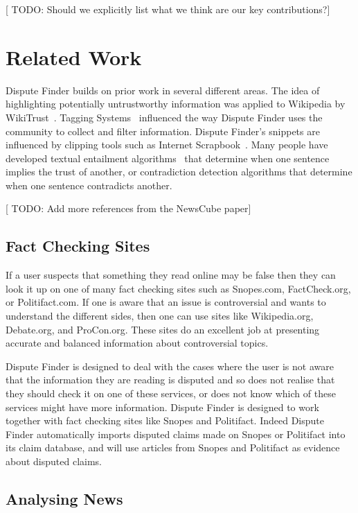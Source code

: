 \documentclass{www2010-submission}
\newcommand{\todo}[1]{{[\color{blue} TODO: #1]}}
\begin{document}
\todo{Should we explicitly list what we think are our key contributions?}


\section{Related Work}

Dispute Finder builds on prior work in several different areas. The idea of highlighting potentially untrustworthy information was applied to Wikipedia by WikiTrust~\cite{Adler2008a}. Tagging Systems~\cite{Marlow2006} influenced the way Dispute Finder uses the community to collect and filter information. Dispute Finder's snippets are influenced by clipping tools such as Internet Scrapbook~\cite{Sugiura1998}. Many people have developed textual entailment algorithms~\cite{entail?} that determine when one sentence implies the trust of another, or contradiction detection algorithms that determine when one sentence contradicts another.

\todo{Add more references from the NewsCube paper}


\subsection{Fact Checking Sites}

If a user suspects that something they read online may be false then they can look it up on one of many fact checking sites such as Snopes.com, FactCheck.org, or Politifact.com. If one is aware that an issue is controversial and wants to understand the different sides, then one can use sites like Wikipedia.org, Debate.org, and ProCon.org. These sites do an excellent job at presenting accurate and balanced information about controversial topics. 

Dispute Finder is designed to deal with the cases where the user is not aware that the information they are reading is disputed and so does not realise that they should check it on one of these services, or does not know which of these services might have more information. Dispute Finder is designed to work together with fact checking sites like Snopes and Politifact. Indeed Dispute Finder automatically imports disputed claims made on Snopes or Politifact into its claim database, and will use articles from Snopes and Politifact as evidence about disputed claims.


\subsection{Analysing News}
\end{document}
